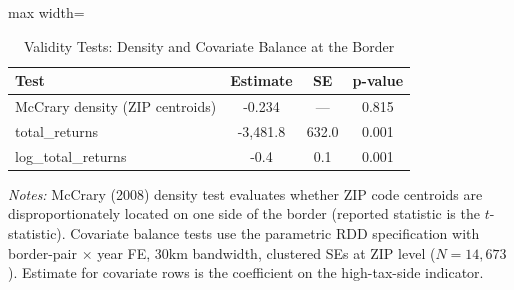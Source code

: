 \begin{table}[htbp]
\centering
\caption{Validity Tests: Density and Covariate Balance at the Border}
\label{tab:validity}
\begin{adjustbox}{max width=\textwidth}
\begin{tabular}{lccc}
  \hline
Test & Estimate & SE & p-value \\ 
  \hline
McCrary density (ZIP centroids) & -0.234 & --- & 0.815 \\ 
  total\_returns & -3,481.8 & 632.0 & 0.001 \\ 
  log\_total\_returns &     -0.4 &   0.1 & 0.001 \\ 
   \hline
\end{tabular}
\end{adjustbox}
\begin{tablenotes}\small
\item \textit{Notes:} McCrary (2008) density test evaluates whether ZIP code centroids are disproportionately located on one side of the border (reported statistic is the $t$-statistic). Covariate balance tests use the parametric RDD specification with border-pair $\times$ year FE, 30km bandwidth, clustered SEs at ZIP level ($N = 14{,}673$). Estimate for covariate rows is the coefficient on the high-tax-side indicator.
\end{tablenotes}
\end{table}
